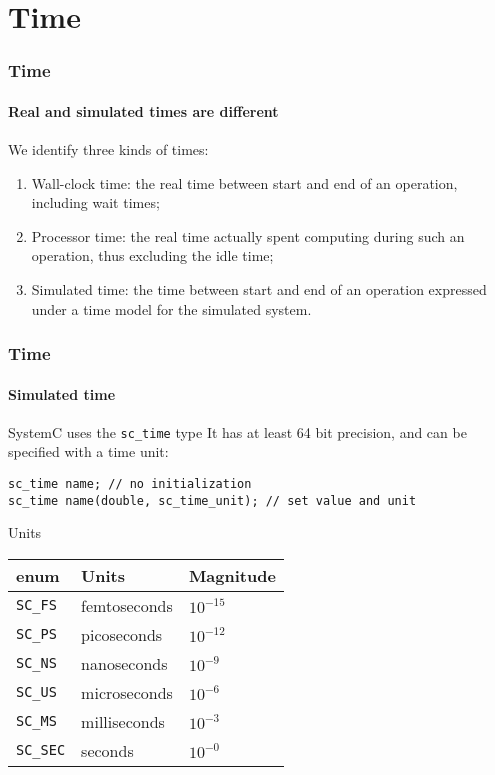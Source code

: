 \section{Time}

\begin{frame}
\frametitle{Time}
\framesubtitle{Real and simulated times are different}

\begin{block}{We identify three kinds of times:}
\begin{enumerate}
\item Wall-clock time: the real time between start and end of an operation, including wait times;
\pause
\item Processor time: the real time actually spent computing during such an operation, thus excluding the idle time;
\pause
\item Simulated time: the time between start and end of an operation expressed under a time model for the simulated system.
\end{enumerate}
\end{block}
\end{frame}

\begin{frame}[fragile]
\frametitle{Time}
\framesubtitle{Simulated time}

\begin{block}{SystemC uses the \texttt{sc\_time} type}
\vspace{0.5em}
It has at least 64 bit precision, and can be specified with a time unit:
\vspace{-0.5em}
{\scriptsize 
\begin{verbatim}
sc_time name; // no initialization
sc_time name(double, sc_time_unit); // set value and unit
\end{verbatim}
}
\vspace{-0.5em}
\end{block}
\pause
\begin{block}{Units}
\begin{table}
\begin{tabular}{lll}
\hline
enum & Units & Magnitude \\
\hline
\texttt{SC\_FS} & femtoseconds & {\small $10^{-15}$} \\
\texttt{SC\_PS} & picoseconds & {\small $10^{-12}$} \\
\texttt{SC\_NS} & nanoseconds & {\small $10^{-9}$} \\
\texttt{SC\_US} & microseconds & {\small $10^{-6}$} \\
\texttt{SC\_MS} & milliseconds & {\small $10^{-3}$} \\
\texttt{SC\_SEC} & seconds & {\small $10^{-0}$} \\
\end{tabular}
\end{table}
\vspace{-1em}
\end{block}
\end{frame}

